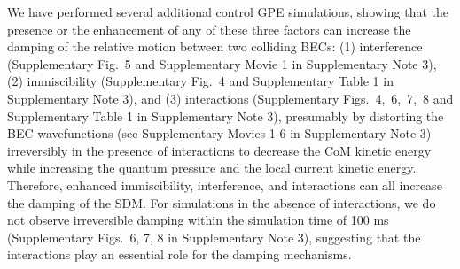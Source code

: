 \documentclass[showpacs,preprintnumbers,amsmath,amssymb, superscriptaddress, aps, reprint]{revtex4-1}
\begin{document}
{{{We have performed several additional control GPE simulations, showing that the presence or the enhancement of any of these three factors can increase the damping of the relative motion between two colliding BECs: (1) interference (Supplementary Fig.~5 and Supplementary Movie 1 in Supplementary Note 3), (2) immiscibility (Supplementary Fig.~4 and Supplementary Table 1 in Supplementary Note 3), and (3) interactions (Supplementary Figs.~4,~6,~7,~8 and Supplementary Table 1 in Supplementary Note 3), presumably by distorting the BEC wavefunctions (see Supplementary Movies 1-6 in Supplementary Note 3) irreversibly in the presence of interactions to decrease the CoM kinetic energy while increasing the quantum pressure and the local current kinetic energy. 
{Therefore, enhanced immiscibility, interference, and
interactions can all increase the damping of the SDM.}
For simulations in the absence of interactions, we do not observe irreversible damping within the simulation time of 100 ms (Supplementary Figs.~6, 7, 8 in Supplementary Note 3), suggesting that the interactions play an essential role for the damping mechanisms.


}}}
\end{document}
